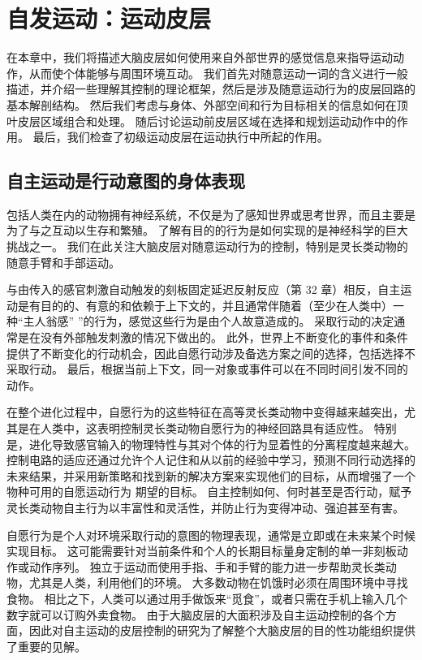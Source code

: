 \chapter{自发运动：运动皮层}
在本章中，我们将描述大脑皮层如何使用来自外部世界的感觉信息来指导运动动作，从而使个体能够与周围环境互动。 我们首先对随意运动一词的含义进行一般描述，并介绍一些理解其控制的理论框架，然后是涉及随意运动行为的皮层回路的基本解剖结构。 然后我们考虑与身体、外部空间和行为目标相关的信息如何在顶叶皮层区域组合和处理。 随后讨论运动前皮层区域在选择和规划运动动作中的作用。 最后，我们检查了初级运动皮层在运动执行中所起的作用。

\section{自主运动是行动意图的身体表现}
包括人类在内的动物拥有神经系统，不仅是为了感知世界或思考世界，而且主要是为了与之互动以生存和繁殖。 了解有目的的行为是如何实现的是神经科学的巨大挑战之一。 我们在此关注大脑皮层对随意运动行为的控制，特别是灵长类动物的随意手臂和手部运动。

与由传入的感官刺激自动触发的刻板固定延迟反射反应（第 32 章）相反，自主运动是有目的的、有意的和依赖于上下文的，并且通常伴随着（至少在人类中）一种“主人翁感” ”的行为，感觉这些行为是由个人故意造成的。 采取行动的决定通常是在没有外部触发刺激的情况下做出的。 此外，世界上不断变化的事件和条件提供了不断变化的行动机会，因此自愿行动涉及备选方案之间的选择，包括选择不采取行动。 最后，根据当前上下文，同一对象或事件可以在不同时间引发不同的动作。

在整个进化过程中，自愿行为的这些特征在高等灵长类动物中变得越来越突出，尤其是在人类中，这表明控制灵长类动物自愿行为的神经回路具有适应性。 特别是，进化导致感官输入的物理特性与其对个体的行为显着性的分离程度越来越大。 控制电路的适应还通过允许个人记住和从以前的经验中学习，预测不同行动选择的未来结果，并采用新策略和找到新的解决方案来实现他们的目标，从而增强了一个物种可用的自愿运动行为 期望的目标。 自主控制如何、何时甚至是否行动，赋予灵长类动物自主行为以丰富性和灵活性，并防止行为变得冲动、强迫甚至有害。

自愿行为是个人对环境采取行动的意图的物理表现，通常是立即或在未来某个时候实现目标。 这可能需要针对当前条件和个人的长期目标量身定制的单一非刻板动作或动作序列。 独立于运动而使用手指、手和手臂的能力进一步帮助灵长类动物，尤其是人类，利用他们的环境。 大多数动物在饥饿时必须在周围环境中寻找食物。 相比之下，人类可以通过用手做饭来“觅食”，或者只需在手机上输入几个数字就可以订购外卖食物。 由于大脑皮层的大面积涉及自主运动控制的各个方面，因此对自主运动的皮层控制的研究为了解整个大脑皮层的目的性功能组织提供了重要的见解。


